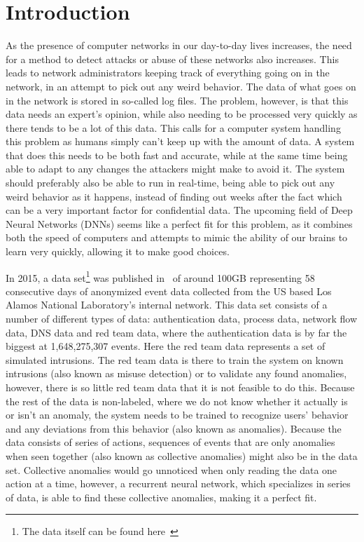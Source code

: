 \chapter{Introduction}\label{ch:introduction}
As the presence of computer networks in our day-to-day lives increases, the need for a method to detect attacks or abuse of these networks also increases. This leads to network administrators keeping track of everything going on in the network, in an attempt to pick out any weird behavior. The data of what goes on in the network is stored in so-called log files. The problem, however, is that this data needs an expert's opinion, while also needing to be processed very quickly as there tends to be a lot of this data. This calls for a computer system handling this problem as humans simply can't keep up with the amount of data. A system that does this needs to be both fast and accurate, while at the same time being able to adapt to any changes the attackers might make to avoid it. The system should preferably also be able to run in real-time, being able to pick out any weird behavior as it happens, instead of finding out weeks after the fact which can be a very important factor for confidential data. The upcoming field of Deep Neural Networks (DNNs) seems like a perfect fit for this problem, as it combines both the speed of computers and attempts to mimic the ability of our brains to learn very quickly, allowing it to make good choices.

In 2015, a data set\footnote{The data itself can be found here~\cite{kent-2015-cyberdata1}} was published in~\cite{akent-2015-enterprise-data} of around 100GB representing 58 consecutive days of anonymized event data collected from the US based Los Alamos National Laboratory's internal network. This data set consists of a number of different types of data: authentication data, process data, network flow data, DNS data and red team data, where the authentication data is by far the biggest at 1,648,275,307 events. Here the red team data represents a set of simulated intrusions. The red team data is there to train the system on known intrusions (also known as misuse detection) or to validate any found anomalies, however, there is so little red team data that it is not feasible to do this. Because the rest of the data is non-labeled, where we do not know whether it actually is or isn't an anomaly, the system needs to be trained to recognize users' behavior and any deviations from this behavior (also known as anomalies). Because the data consists of series of actions, sequences of events that are only anomalies when seen together (also known as collective anomalies) might also be in the data set. Collective anomalies would go unnoticed when only reading the data one action at a time, however, a recurrent neural network, which specializes in series of data, is able to find these collective anomalies, making it a perfect fit.

